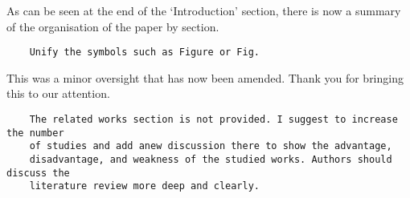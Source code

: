 \documentclass[11pt]{article}
\begin{document}
As can be seen at the end of the `Introduction' section, there is now a summary
of the organisation of the paper by section.\\

\begin{tcolorbox}
\begin{verbatim}
    Unify the symbols such as Figure or Fig.
\end{verbatim}
\end{tcolorbox}

This was a minor oversight that has now been amended. Thank you for bringing
this to our attention.\\

\begin{tcolorbox}
\begin{verbatim}
    The related works section is not provided. I suggest to increase the number
    of studies and add anew discussion there to show the advantage,
    disadvantage, and weakness of the studied works. Authors should discuss the
    literature review more deep and clearly.
\end{verbatim}
\end{tcolorbox}
\end{document}
